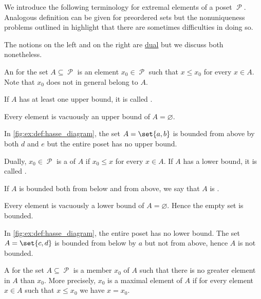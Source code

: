 \begin{definition}\label{def:poset_extremal_points}
  We introduce the following terminology for extremal elements of a poset \( \mscrP \). Analogous definition can be given for preordered sets but the nonuniqueness problems outlined in  highlight that there are sometimes difficulties in doing so.

  The notions on the left and on the right are \hyperref[def:poset/duality]{dual} but we discuss both nonetheless.

  \begin{thmenum}
    \begin{minipage}[t]{0.45\textwidth}
      An  for the set \( A \subseteq \mscrP \) is an element \( x_0 \in \mscrP \) such that \( x \leq x_0 \) for every \( x \in A \). Note that \( x_0 \) does not in general belong to \( A \).

      If \( A \) has at least one upper bound, it is called .

      Every element is vacuously an upper bound of \( A = \varnothing \).

      In \cref{fig:ex:def:hasse_diagram}, the set \( A = \set{ a, b } \) is bounded from above by both \( d \) and \( e \) but the entire poset has no upper bound.
    \end{minipage}
    \hspace{0.02\textwidth}
    \begin{minipage}[t]{0.45\textwidth}
      Dually, \( x_0 \in \mscrP \) is a  of \( A \) if \( x_0 \leq x \) for every \( x \in A \). If \( A \) has a lower bound, it is called .

      If \( A \) is bounded both from below and from above, we say that \( A \) is .

      Every element is vacuously a lower bound of \( A = \varnothing \). Hence the empty set is bounded.

      In \cref{fig:ex:def:hasse_diagram}, the entire poset has no lower bound. The set \( A = \set{ c, d } \) is bounded from below by \( a \) but not from above, hence \( A \) is not bounded.
    \end{minipage}

    \begin{minipage}[t]{0.45\textwidth}
      A  for the set \( A \subseteq \mscrP \) is a member \( x_0 \) of \( A \) such that there is no greater element in \( A \) than \( x_0 \). More precisely, \( x_0 \) is a maximal element of \( A \) if for every element \( x \in A \) such that \( x \leq x_0 \) we have \( x = x_0 \).


\end{minipage}
\end{thmenum}
\end{definition}

